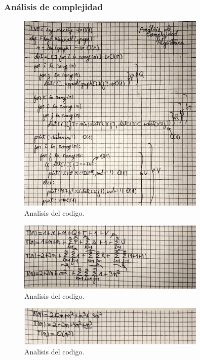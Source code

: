 \subsubsection{Análisis de complejidad}
\begin{figure}[H]
	\centering
	\includegraphics[width=0.8\textwidth]{complejidad_distancia_ejem1_1.png}
	\caption{Analisis del codigo.}
	\label{fig:complejidad1}
\end{figure}
\begin{figure}[H]
	\centering
	\includegraphics[width=0.8\textwidth]{complejidad_distancia_ejem1_2.png}
	\caption{Analisis del codigo.}
	\label{fig:complejidad1}
\end{figure}
\begin{figure}[H]
	\centering
	\includegraphics[width=0.8\textwidth]{complejidad_distancia_ejem1_3.png}
	\caption{Analisis del codigo.}
	\label{fig:complejidad1}
\end{figure}


